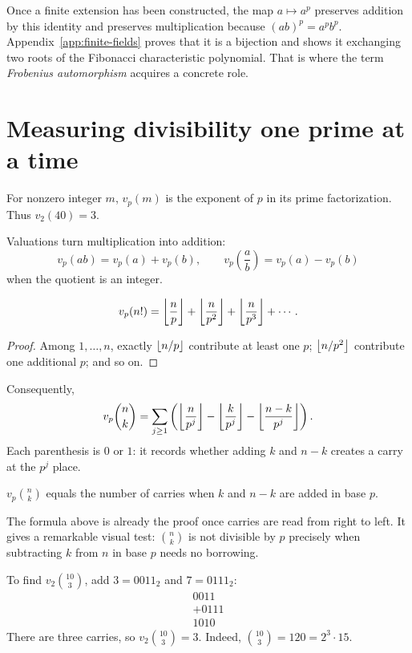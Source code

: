 Once a finite extension has been constructed, the map $a\mapsto a^p$
preserves addition by this identity and preserves multiplication because
$(ab)^p=a^pb^p$. Appendix~\ref{app:finite-fields} proves that it is a
bijection and shows it exchanging two roots of the Fibonacci
characteristic polynomial. That is where the term
\emph{Frobenius automorphism} acquires a concrete role.

\section{Measuring divisibility one prime at a time}

\begin{definition}
For nonzero integer $m$, $v_p(m)$ is the exponent of $p$ in its prime factorization. Thus $v_2(40)=3$.
\end{definition}

Valuations turn multiplication into addition:
\[
v_p(ab)=v_p(a)+v_p(b),\qquad
v_p\!\left(\frac ab\right)=v_p(a)-v_p(b)
\]
when the quotient is an integer.

\begin{theorem}[Legendre]
\[
v_p(n!)=\left\lfloor \frac np\right\rfloor+\left\lfloor \frac n{p^2}\right\rfloor+\left\lfloor \frac n{p^3}\right\rfloor+\cdots.
\]
\end{theorem}

\begin{proof}
Among $1,\dots,n$, exactly $\left\lfloor n/p\right\rfloor$ contribute at least one $p$; $\left\lfloor n/p^2\right\rfloor$ contribute one additional $p$; and so on.
\end{proof}

Consequently,
\[
v_p\binom nk=\sum_{j\ge1}\left(\left\lfloor \frac n{p^j}\right\rfloor-\left\lfloor \frac k{p^j}\right\rfloor-\left\lfloor \frac{n-k}{p^j}\right\rfloor\right).
\]
Each parenthesis is $0$ or $1$: it records whether adding $k$ and $n-k$ creates a carry at the $p^j$ place.

\begin{theorem}
$v_p\binom nk$ equals the number of carries when $k$ and $n-k$ are added in base $p$.
\end{theorem}

The formula above is already the proof once carries are read from right to left. It gives a remarkable visual test: $\binom nk$ is not divisible by $p$ precisely when subtracting $k$ from $n$ in base $p$ needs no borrowing.

\begin{example}
To find $v_2\binom{10}{3}$, add $3=0011_2$ and $7=0111_2$:
\[
\begin{array}{r}0011\\+0111\\\hline1010\end{array}
\]
There are three carries, so $v_2\binom{10}{3}=3$. Indeed, $\binom{10}{3}=120=2^3\cdot15$.
\end{example}

